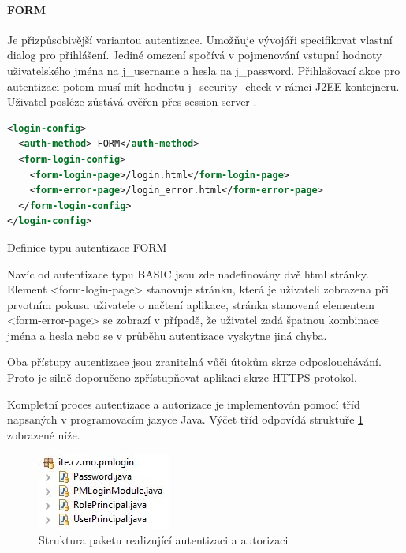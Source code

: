 \documentclass[thesis=M,czech]{FITthesis}[2012/06/26]
\begin{document}
\paragraph{FORM} Je přizpůsobivější variantou autentizace. Umožňuje vývojáři specifikovat vlastní dialog pro přihlášení. Jediné omezení spočívá v pojmenování vstupní hodnoty uživatelského jména na j\_username a hesla na j\_password. Přihlašovací akce pro autentizaci potom musí mít hodnotu j\_security\_check v rámci J2EE kontejneru. Uživatel posléze zůstává ověřen přes session server \cite{basic_form}.

\begin{algorithm}[H]	
	\begin{lstlisting}[language = XML]  
<login-config> 
  <auth-method> FORM</auth-method> 
  <form-login-config> 
    <form-login-page>/login.html</form-login-page>
    <form-error-page>/login_error.html</form-error-page>
  </form-login-config> 
</login-config>
	\end{lstlisting}
	\caption{Definice typu autentizace FORM}	
	\label{code:auth_form_def}
	\small Navíc od autentizace typu BASIC jsou zde nadefinovány dvě html stránky. Element <form-login-page> stanovuje stránku, která je uživateli zobrazena při prvotním pokusu uživatele o načtení aplikace, stránka stanovená elementem <form-error-page> se zobrazí v případě, že uživatel zadá špatnou kombinace jména a hesla nebo se v průběhu autentizace vyskytne jiná chyba.
\end{algorithm}	

Oba přístupy autentizace jsou zranitelná vůči útokům skrze odposlouchávání. Proto je silně doporučeno zpřístupňovat aplikaci skrze HTTPS protokol. 

Kompletní proces autentizace a autorizace je implementován pomocí tříd napsaných v programovacím jazyce Java. Výčet tříd odpovídá struktuře \ref{img:loginmodule_structure} zobrazené níže. 

\begin{figure}[H]
	\centering
	\includegraphics[]{images/loginmodule_structure}
	\caption{Struktura paketu realizující autentizaci a autorizaci}
	\label{img:loginmodule_structure}
\end{figure}
\end{document}
